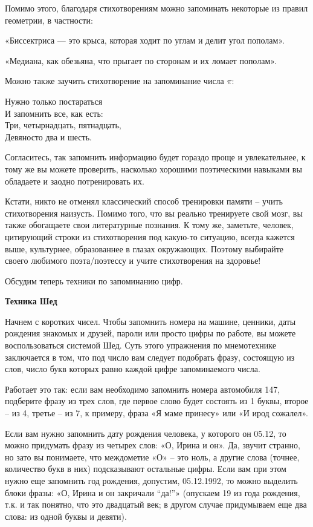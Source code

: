 Помимо этого, благодаря стихотворениям можно запоминать некоторые из правил геометрии, в частности:

«Биссектриса — это крыса, которая ходит по углам и делит угол пополам».

«Медиана, как обезьяна, что прыгает по сторонам и их ломает пополам».

Можно также заучить стихотворение на запоминание числа $\pi$:

\begin{fancyquotes}
    \begin{flushright}
        Нужно только постараться\\
        И запомнить все, как есть:\\
        Три, четырнадцать, пятнадцать,\\
        Девяносто два и шесть.
    \end{flushright}
\end{fancyquotes}

Согласитесь, так запомнить информацию будет гораздо проще и увлекательнее, к тому же вы можете проверить, насколько хорошими поэтическими навыками вы обладаете и заодно потренировать их.

Кстати, никто не отменял классический способ тренировки памяти – учить стихотворения наизусть. Помимо того, что вы реально тренируете свой мозг, вы также обогащаете свои литературные познания. К тому же, заметьте, человек, цитирующий строки из стихотворения под какую-то ситуацию, всегда кажется выше, культурнее, образованнее в глазах окружающих. Поэтому выбирайте своего любимого поэта/поэтессу и учите стихотворения на здоровье!

Обсудим теперь техники по запоминанию цифр.

\textbf{Техника Шед}

Начнем с коротких чисел. Чтобы запомнить номера на машине, ценники, даты рождения знакомых и друзей, пароли или просто цифры по работе, вы можете воспользоваться системой Шед. Суть этого упражнения по мнемотехнике заключается в том, что под число вам следует подобрать фразу, состоящую из слов, число букв которых равно каждой цифре запоминаемого числа.

Работает это так: если вам необходимо запомнить номера автомобиля 147, подберите фразу из трех слов, где первое слово будет состоять из 1 буквы, второе – из 4, третье – из 7, к примеру, фраза «Я маме принесу» или «И ирод сожалел».

Если вам нужно запомнить дату рождения человека, у которого он 05.12, то можно придумать фразу из четырех слов: «О, Ирина и он». Да, звучит странно, но зато вы понимаете, что междометие «О» – это ноль, а другие слова (точнее, количество букв в них) подсказывают остальные цифры. Если вам при этом нужно еще запомнить год рождения, допустим, 05.12.1992, то можно выделить блоки фразы: «О, Ирина и он закричали “да!”» (опускаем 19 из года рождения, т.к. и так понятно, что это двадцатый век; в другом случае придумываем еще два слова: из одной буквы и девяти).

